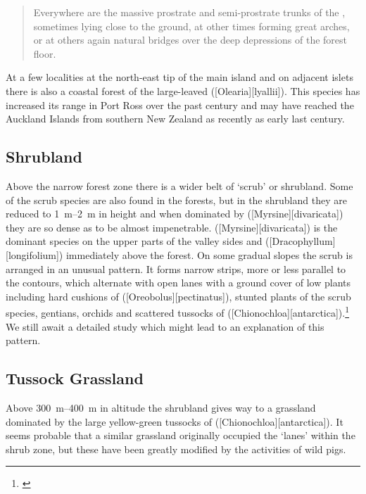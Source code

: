 \begin{quote}
	Everywhere are the massive prostrate and semi-prostrate trunks of the , sometimes lying close to the ground, at other times forming great arches, or at others again natural bridges over the deep depressions of the forest floor.
\end{quote}

At a few localities at the north-east tip of the main island and on adjacent islets there is also a coastal forest of the large-leaved  ([Olearia][lyallii]).
This species has increased its range in Port Ross over the past century and may have reached the Auckland Islands from southern New Zealand as recently as early last century.

\subsection{Shrubland}

Above the narrow forest zone there is a wider belt of `scrub' or shrubland.
Some of the scrub species are also found in the forests, but in the shrubland they are reduced to \SIrange{1}{2}{\metre} in height and when dominated by  ([Myrsine][divaricata]) they are so dense as to be almost impenetrable.
 ([Myrsine][divaricata]) is the dominant species on the upper parts of the valley sides and  ([Dracophyllum][longifolium]) immediately above the  forest.
On some gradual slopes the scrub is arranged in an unusual pattern.
It forms narrow strips, more or less parallel to the contours, which alternate with open lanes with a ground cover of low plants including hard cushions of  ([Oreobolus][pectinatus]), stunted plants of the scrub species, gentians, orchids and scattered tussocks of  ([Chionochloa][antarctica]).\footnote{\cite{godley1965notes}}
We still await a detailed study which might lead to an explanation of this pattern.

\subsection{Tussock Grassland}

Above \SIrange{300}{400}{\metre} in altitude the shrubland gives way to a grassland dominated by the large yellow-green tussocks of  ([Chionochloa][antarctica]).
It seems probable that a similar grassland originally occupied the `lanes' within the shrub zone, but these have been greatly modified by the activities of wild pigs.

